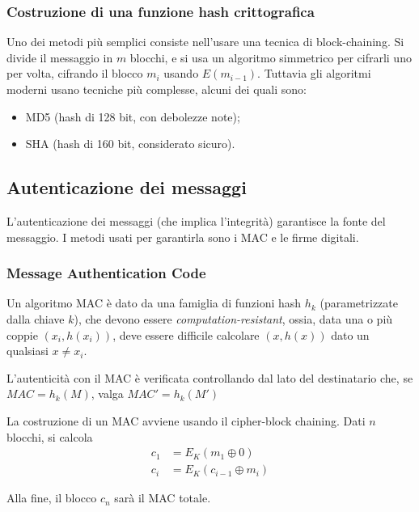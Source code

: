 \documentclass[a4paper, 10pt, twoside]{article}
\begin{document}
	\subsubsection{Costruzione di una funzione hash crittografica}
	Uno dei metodi più semplici consiste nell'usare una tecnica di block-chaining.
	Si divide il messaggio in $m$ blocchi, e si usa un algoritmo simmetrico per cifrarli uno per volta, cifrando il blocco $m_i$ usando $E(m_{i-1})$. Tuttavia gli algoritmi moderni usano tecniche più complesse, alcuni dei quali sono:\begin{itemize}
		\item MD5 (hash di 128 bit, con debolezze note);
		\item SHA (hash di 160 bit, considerato sicuro).
	\end{itemize}

	\subsection{Autenticazione dei messaggi}
	L'autenticazione dei messaggi (che implica l'integrità) garantisce la fonte del messaggio. I metodi usati per garantirla sono i MAC e le firme digitali.
	
	\subsubsection{Message Authentication Code}
	Un algoritmo MAC è dato da una famiglia di funzioni hash $h_k$ (parametrizzate dalla chiave $k$), che devono essere \textit{computation-resistant}, ossia, data una o più coppie $(x_i, h(x_i))$, deve essere difficile calcolare $(x, h(x))$ dato un qualsiasi $x \neq x_i$.
	
	L'autenticità con il MAC è verificata controllando dal lato del destinatario che, se $MAC = h_k(M)$, valga $MAC' = h_k(M')$
	
	La costruzione di un MAC avviene usando il cipher-block chaining. Dati $n$ blocchi, si calcola \begin{align*}
		c_1 &= E_K(m_1 \oplus 0) \\
		c_i &= E_K(c_{i-1} \oplus m_i)
	\end{align*}
	
	Alla fine, il blocco $c_n$ sarà il MAC totale.
	
\end{document}
